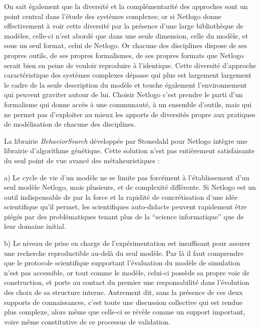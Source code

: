 On sait également que la diversité et la complémentarité des approches sont un point central dans l'étude des systèmes complexes; or si Netlogo donne effectivement à voir cette diversité par la présence d'une large bibliothèque de modèles, celle-ci n'est abordé que dans une seule dimension, celle du modèle, et sous un seul format, celui de Netlogo. Or chacune des disciplines dispose de ses propres outils, de ses propres formalismes, de ses propres formats que Netlogo serait bien en peine de vouloir reproduire à l'identique. Cette diversité d'approche caractéristique des systèmes complexes dépasse qui plus est largement largement le cadre de la seule description du modèle et touche également l'environnement qui peuvent graviter autour de lui. Choisir Netlogo c'est prendre le parti d'un formalisme qui donne accès à une communauté, à un ensemble d'outils, mais qui ne permet pas d'exploiter au mieux les apports de diversités propre aux pratiques de modélisation de chacune des disciplines. 

La librairie \textit{BehaviorSearch} développée par Stonedahl pour Netlogo intègre une librairie d'algorithme génétique. Cette solution n'est pas entièrement satisfaisante du seul point de vue avancé des métaheuristiques :

a) Le cycle de vie d'un modèle ne se limite pas forcément à l'établissement d'un seul modèle Netlogo, mais plusieurs, et de complexité différente. Si Netlogo est un outil indispensable de par la force et la rapidité de concrétisation d'une idée scientifique qu'il permet, les scientifiques auto-didacte peuvent rapidement être piégés par des problématiques tenant plus de la \enquote{science informatique} que de leur domaine initial.

b) Le niveau de prise en charge de l'expérimentation est insuffisant pour assurer une recherche reproductible au-delà du seul modèle. Par là il faut comprendre que le protocole scientifique supportant l'évaluation du modèle de simulation n'est pas accessible, or tout comme le modèle, celui-ci possède sa propre voie de construction, et porte au contact du premier une responsabilité dans l'évolution des choix de sa structure interne. Autrement dit, sans la présence de ces deux supports de connaissances, c'est toute une discussion collective qui est rendue plus complexe, alors même que celle-ci se révèle comme un support important, voire même constitutive de ce processus de validation.

